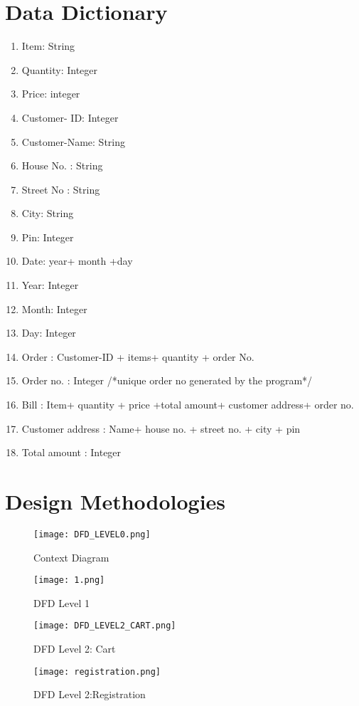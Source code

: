 \documentclass{article}
\begin{document}
\section{Data Dictionary}
\begin{enumerate}
\item Item: String
\item Quantity: Integer
\item Price: integer
\item Customer- ID: Integer
\item Customer-Name: String
\item House No. : String
 \item Street No : String
\item City: String
\item Pin: Integer
\item Date: year+ month +day
\item Year: Integer
\item Month: Integer
\item Day: Integer
\item Order : Customer-ID +{ items+ quantity} + order No.
\item Order no. : Integer /*unique order no generated by the program*/
\item Bill : { Item+ quantity + price} +total amount+ customer address+ order no.
\item Customer address : Name+ house no. + street no. + city + pin
\item Total amount : Integer
\end{enumerate}
\section{Design Methodologies}

\begin{figure}
\texttt{[image: DFD\_LEVEL0.png]}
\caption{Context Diagram}
\vspace{2cm}
\texttt{[image: 1.png]}
\caption{DFD Level 1}
\vspace{2cm}

\end{figure}
\begin{figure}
\texttt{[image: DFD\_LEVEL2\_CART.png]}
\caption{ DFD Level 2: Cart}
\vspace{2cm}
\end{figure}
\begin{figure}
\texttt{[image: registration.png]}
\caption{DFD Level 2:Registration}


\end{figure}
\end{document}
